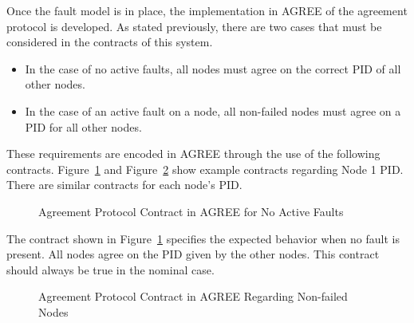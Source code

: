 Once the fault model is in place, the implementation in AGREE of the agreement protocol is developed. As stated previously, there are two cases that must be considered in the contracts of this system. 
\begin{itemize}
	\item In the case of no active faults, all nodes must agree on the correct PID of all other nodes. 
	\item In the case of an active fault on a node, all non-failed nodes must agree on a PID for all other nodes. 
\end{itemize}

These requirements are encoded in AGREE through the use of the following contracts. Figure~\ref{fig:PIDContract1} and Figure~\ref{fig:PIDContract2} show example contracts regarding Node 1 PID. There are similar contracts for each node's PID. 
\begin{figure}[!htb]
        \caption{\label{fig:PIDContract1} Agreement Protocol Contract in AGREE for No Active Faults}
\end{figure}

The contract shown in Figure~\ref{fig:PIDContract1} specifies the expected behavior when no fault is present. All nodes agree on the PID given by the other nodes. This contract should always be true in the nominal case.

\begin{figure}[!htb]
        \caption{\label{fig:PIDContract2} Agreement Protocol Contract in AGREE Regarding Non-failed Nodes}
\end{figure}


